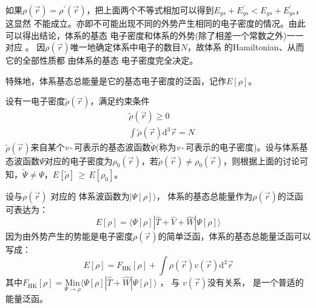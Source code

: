 {如果}$\rho(\vec{r})\!=\!\rho^{\prime}(\vec{r})$，把上面两个不等式相加可以得到$E_{gs}+E^{\prime}_{gs}\!<\!E_{gs}+E^{\prime}_{gs}$，这显然%
{不能成立。亦即不可能出现不同的外势产生相同的电子密度的情况}。由此可以得出结论，体系的基态%
{电}子密度和体系的外势(除了相差一个常数之外)一一对应%
{。}%
{因$\rho(\vec r)$唯一地确定体系中电子的数目$N$，故}体系%
{%
的\textrm{Hamiltonian}、从而它的全部}性质都%
由体系的基态%
{电}子密度完全决定。{特殊地，体系基态总能量是它的基态电子密度的泛函，记作$E[\rho]$。
	
设有一电子密度$\tilde\rho(\vec r)$，满足约束条件
\begin{displaymath}
	\begin{aligned}
		&\tilde\rho(\vec r)\!\geqslant\!0\\
		&\int\tilde\rho(\vec r)\textrm{d}^3\vec r\!=\!N
	\end{aligned}
\end{displaymath}
$\tilde\rho(\vec r)$来自某个\textit{v}\,-\,可表示的基态波函数$\tilde\Psi$(称为\textit{v}\,-\,可表示的电子密度)。设与体系基态波函数$\Psi$对应的电子密度为$\rho_0(\vec r)$，若$\tilde\rho(\vec r)\!\neq\!\rho_0(\vec r)$，则根据上面的讨论可知，$\tilde\Psi\!\neq\!\Psi$，$E[\tilde\rho]$\,$\geqslant$\,$E[\rho_0]$。}

{设}与$\rho(\vec{r})$%
对应的%
体系波函数为$|\Psi[\rho]\rangle$，%
体系的基态总能量作为$\rho(\vec{r})
$的泛函%
{可表达}为：
\begin{equation}
	E[\rho]=\langle\Psi[\rho]|\hat{T}+\hat{V}+\hat{W}|\Psi[\rho]\rangle
	\label{eq:DFT_02}
\end{equation}
{因为由外势产生的势能是电子密度$\rho(\vec r)$的简单泛函，}体系的{基态}总能量泛函可以写成：
\begin{equation}
	E[\rho]=F_{\mathrm{HK}}[\rho]+\int\rho(\vec{r})v(\vec{r})\textrm{d}^3\vec{r}
	\label{eq:DFT_03}
\end{equation}
其中$F_{\mathrm{HK}}[\rho]=\underset{\Psi\to\rho}{\mathrm{Min}}\langle\Psi[\rho]|\hat{T}+\hat{W}|\Psi[\rho]\rangle$%
{，}%
与%
{$v(\vec r)$}没有关系，%
{是一个普适的能量泛函。}

